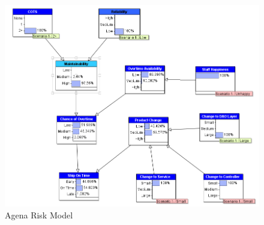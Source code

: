 \begin{figure} [H]
\begin{center}
\includegraphics[scale=0.7]{risk.png}
\caption{Agena Risk Model}
\label{fig:agenarisk}
\end{center}
\end{figure}